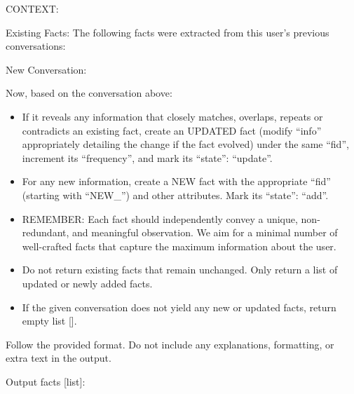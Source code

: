 \begin{promptbox}
CONTEXT:

Existing Facts: The following facts were extracted from this user's previous conversations: 


New Conversation:


Now, based on the conversation above:
\begin{itemize}
  \item If it reveals any information that closely matches, overlaps, repeats or contradicts an existing fact, create an UPDATED fact (modify ``info'' appropriately detailing the change if the fact evolved) under the same ``fid'', increment its ``frequency'', and mark its ``state'': ``update''.
  \item For any new information, create a NEW fact with the appropriate ``fid'' (starting with ``NEW\_'') and other attributes. Mark its ``state'': ``add''.
  \item REMEMBER: Each fact should independently convey a unique, non-redundant, and meaningful observation. We aim for a minimal number of well-crafted facts that capture the maximum information about the user. 
  \item Do not return existing facts that remain unchanged. Only return a list of updated or newly added facts.
  \item If the given conversation does not yield any new or updated facts, return empty list [].
\end{itemize}

Follow the provided format. Do not include any explanations, formatting, or extra text in the output.

Output facts [list]:
\end{promptbox}


\vspace{2em}


